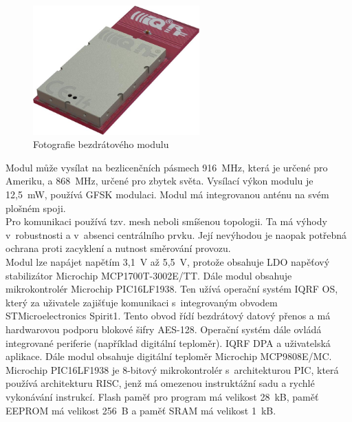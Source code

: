 \documentclass[12pt,a4paper,oneside]{article}
\begin{document}
\begin{figure}[H]
\centering
\label{fig:iqrf/fotka}
\includegraphics[width = 64mm]{img/iqrf/dctr-72dat.png}
\caption{Fotografie bezdrátového modulu}
\end{figure}

Modul může vysílat na bezlicenčních pásmech 916~MHz, která je určené pro Ameriku, a 868~MHz, určené pro zbytek světa. Vysílací výkon modulu je 12,5~mW, používá GFSK modulaci. Modul má integrovanou anténu na svém plošném spoji. \\

Pro komunikaci používá tzv. mesh neboli smíšenou topologii. Ta má výhody v~robustnosti a v~absenci centrálního prvku. Její nevýhodou je naopak potřebná ochrana proti zacyklení a nutnost směrování provozu. \\

Modul lze napájet napětím 3,1~V až 5,5~V, protože obsahuje LDO napěťový stabilizátor Microchip MCP1700T-3002E/TT. Dále modul obsahuje mikrokontrolér Microchip PIC16LF1938. Ten užívá operační systém IQRF OS, který za uživatele zajišťuje komunikaci s~integrovaným obvodem STMicroelectronics Spirit1. Tento obvod řídí bezdrátový datový přenos a má hardwarovou podporu blokové šifry AES-128. Operační systém dále ovládá integrované periferie (například digitální teploměr). IQRF DPA a uživatelská aplikace. Dále modul obsahuje digitální teploměr Microchip MCP9808E/MC. \\

Microchip PIC16LF1938 je 8-bitový mikrokontrolér s~architekturou PIC, která používá architekturu RISC, jenž má omezenou instruktážní sadu a rychlé vykonávání instrukcí. Flash paměť pro program má velikost 28~kB, paměť EEPROM má velikost 256~B a paměť SRAM má velikost 1~kB.
\end{document}
